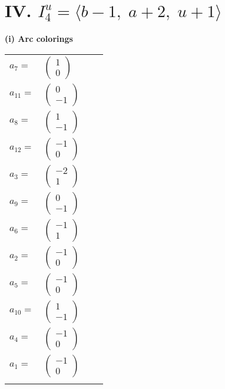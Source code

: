 \documentclass[1p]{elsarticle_modified}
\theoremstyle{definition}
\begin{document}
\centering \section*{IV. $I^u_{4}= \langle b-1,\;a+2,\;u+1 \rangle$}
\flushleft \textbf{(i) Arc colorings}\\
\begin{tabular}{m{7pt} m{180pt} m{7pt} m{180pt} }
\flushright $a_{7}=$&$\begin{pmatrix}1\\0\end{pmatrix}$ \\
\flushright $a_{11}=$&$\begin{pmatrix}0\\-1\end{pmatrix}$ \\
\flushright $a_{8}=$&$\begin{pmatrix}1\\-1\end{pmatrix}$ \\
\flushright $a_{12}=$&$\begin{pmatrix}-1\\0\end{pmatrix}$ \\
\flushright $a_{3}=$&$\begin{pmatrix}-2\\1\end{pmatrix}$ \\
\flushright $a_{9}=$&$\begin{pmatrix}0\\-1\end{pmatrix}$ \\
\flushright $a_{6}=$&$\begin{pmatrix}-1\\1\end{pmatrix}$ \\
\flushright $a_{2}=$&$\begin{pmatrix}-1\\0\end{pmatrix}$ \\
\flushright $a_{5}=$&$\begin{pmatrix}-1\\0\end{pmatrix}$ \\
\flushright $a_{10}=$&$\begin{pmatrix}1\\-1\end{pmatrix}$ \\
\flushright $a_{4}=$&$\begin{pmatrix}-1\\0\end{pmatrix}$ \\
\flushright $a_{1}=$&$\begin{pmatrix}-1\\0\end{pmatrix}$\\&\end{tabular}
\end{document}
